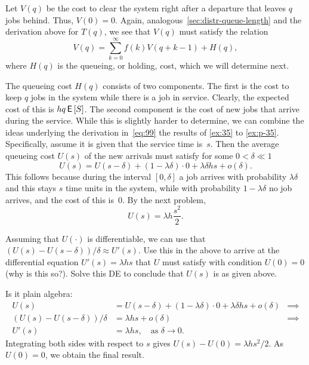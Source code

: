 Let $V(q)$ be the cost to clear the system right after a departure that leaves $q$ jobs behind.
Thus, $V(0)=0$.
Again, analogous~\cref{sec:distr-queue-length} and the derivation above for $T(q)$, we see that $V(q)$ must satisfy the relation
\begin{equation}
  \label{eq:98}
  V(q) = \sum_{k=0}^\infty f(k) V(q+k-1) + H(q), 
\end{equation}
where $H(q)$ is the queueing, or holding, cost, which we will determine next.

The queueing cost $H(q)$ consists of two components.
The first is the cost to keep $q$ jobs in the system while there is a job in service.
Clearly, the expected cost of this is $h q \,\mathsf{E}\left[S\right]$.
The second component is the cost of new jobs that arrive during the service.
While this is slightly harder to determine, we can combine the ideas underlying the derivation in~\cref{eq:99} the results of \cref{ex:35} to \cref{ex:p-35}.
Specifically, assume it is given that the service time is~$s$.
Then the average queueing cost $U(s)$ of the new arrivals must satisfy for some $0<\delta\ll 1$
\begin{equation*}
  U(s) = U(s-\delta) + (1-\lambda \delta)\cdot 0 + \lambda \delta h s + o(\delta).
\end{equation*}
This follows because during the interval $[0,\delta]$ a job arrives with probability $\lambda \delta$ and this stays $s$ time units in the system, while with probability $1-\lambda \delta$ no job arrives, and the cost of this is~$0$.
By the next problem, 
\begin{equation*}
  U(s) = \lambda h \frac{s^2}2. 
\end{equation*}

\begin{exercise}
Assuming that $U(\cdot)$ is differentiable, we can use that $(U(s) - U(s-\delta))/\delta \approx U'(s)$.
Use this in the above to arrive at the differential equation $U'(s) = \lambda h s$ that $U$ must satisfy with condition $U(0)=0$ (why is this so?).
Solve this DE to conclude that $U(s)$ is as given above. 
\begin{solution}
Is it plain algebra:
\begin{align*}
  U(s)&=  U(s-\delta) + (1-\lambda \delta)\cdot 0 + \lambda \delta h s + o(\delta) &\implies\\
  (U(s) -U(s-\delta))/\delta &= \lambda h s + o(\delta) & \implies \\
  U'(s)&= \lambda h s, \quad\text{as } \delta \to 0.
\end{align*}
Integrating  both sides with respect to $s$ gives $U(s) - U(0) = \lambda h s^2/2$. As $U(0)=0$, we obtain the final result.
\end{solution}
\end{exercise}

